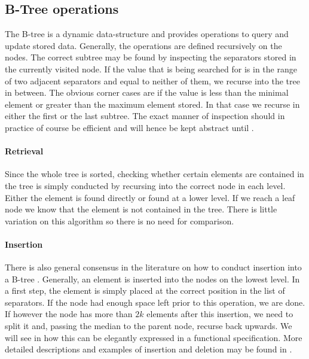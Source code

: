 
\subsection{B-Tree operations}

The B-tree is a dynamic data-structure and provides
operations to query and update stored data.
Generally, the operations are defined recursively on the nodes.
The correct subtree may be found by inspecting the separators stored
in the currently visited node.
If the value that is being searched for is in the range of two
adjacent separators and equal to neither of them,
we recurse into the tree in between. 
The obvious corner cases are if the value is less than the
minimal element or greater than the maximum element stored.
In that case we recurse in either the first or the last subtree.
The exact manner of inspection should in practice of course
be efficient and will hence be kept abstract until .

\paragraph{Retrieval}\label{par:intro-isin}
Since the whole tree is sorted,
checking whether certain elements are contained in the tree
is simply conducted by recursing into the correct node
in each level.
Either the element is found directly or found at a lower level.
If we reach a leaf node we know that the element is not contained in the tree.
There is little variation on this algorithm so there is no need for comparison.

\paragraph{Insertion}\label{par:intro-ins}
There is also general consensus in the literature on
how to conduct insertion into a B-tree \parencite{DBLP:journals/csur/Comer79}.
Generally, an element is inserted into the nodes on the lowest level.
In a first step, the element is simply placed at the correct
position in the list of separators.
If the node had enough space left prior to this operation,
we are done.
If however the node has more than $2k$ elements after this insertion,
we need to split it and, passing the median to the parent node,
recurse back upwards.
We will see in  how this can be
elegantly expressed in a functional specification.
More detailed descriptions and examples of insertion and deletion may be found
in \parencite{DBLP:books/daglib/0023376}.

